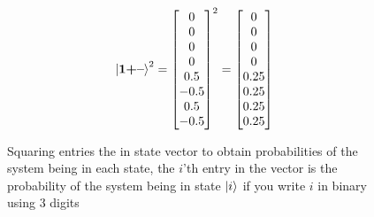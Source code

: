 \begin{figure}[H]
    \centering
    \begin{gather*}
        \ket{\mathbf{1}\textbf{+}\textbf{--}}^2=
        \begin{bmatrix}
            0\\
            0\\
            0\\
            0\\
            0.5\\
            -0.5\\
            0.5\\
            -0.5\\
        \end{bmatrix}^2
        =
        \begin{bmatrix}
            0\\
            0\\
            0\\
            0\\
            0.25\\
            0.25\\
            0.25\\
            0.25\\
        \end{bmatrix}
    \end{gather*}
    \caption{Squaring entries the in state vector to obtain probabilities of the system being in each state, the $i$'th entry in the vector is the probability of the system being in state $\ket{i}$ if you write $i$ in binary using 3 digits}
    \label{fig:square_state}
\end{figure}

